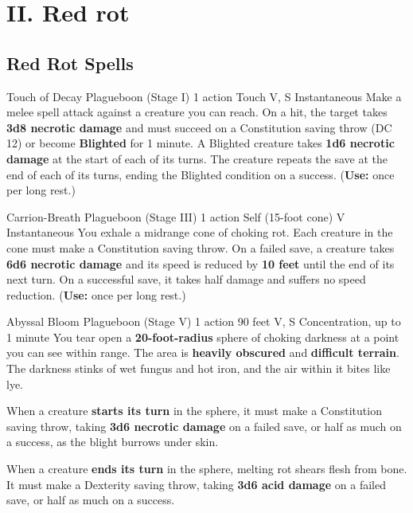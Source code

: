 \documentclass{apotheosis-book}
\begin{document}
\newpage

\section{II. Red rot}
\subsection{Red Rot Spells}

\DndSpellHeader%
  {Touch of Decay}
  {Plagueboon (Stage I)}
  {1 action}
  {Touch}
  {V, S}
  {Instantaneous}
Make a melee spell attack against a creature you can reach. On a hit, the target takes \textbf{3d8 necrotic damage} and must succeed on a Constitution saving throw (DC 12) or become \textbf{Blighted} for 1 minute. A Blighted creature takes \textbf{1d6 necrotic damage} at the start of each of its turns. The creature repeats the save at the end of each of its turns, ending the Blighted condition on a success.
(\textbf{Use:} once per long rest.)

\medskip

\DndSpellHeader%
  {Carrion-Breath}
  {Plagueboon (Stage III)}
  {1 action}
  {Self (15-foot cone)}
  {V}
  {Instantaneous}
You exhale a midrange cone of choking rot. Each creature in the cone must make a Constitution saving throw. On a failed save, a creature takes \textbf{6d6 necrotic damage} and its speed is reduced by \textbf{10 feet} until the end of its next turn. On a successful save, it takes half damage and suffers no speed reduction.
(\textbf{Use:} once per long rest.)

\medskip

\DndSpellHeader%
  {Abyssal Bloom}
  {Plagueboon (Stage V)}
  {1 action}
  {90 feet}
  {V, S}
  {Concentration, up to 1 minute}
You tear open a \textbf{20-foot-radius} sphere of choking darkness at a point you can see within range. The area is \textbf{heavily obscured} and \textbf{difficult terrain}. The darkness stinks of wet fungus and hot iron, and the air within it bites like lye.

When a creature \textbf{starts its turn} in the sphere, it must make a Constitution saving throw, taking \textbf{3d6 necrotic damage} on a failed save, or half as much on a success, as the blight burrows under skin.

When a creature \textbf{ends its turn} in the sphere, melting rot shears flesh from bone. It must make a Dexterity saving throw, taking \textbf{3d6 acid damage} on a failed save, or half as much on a success.
\end{document}
